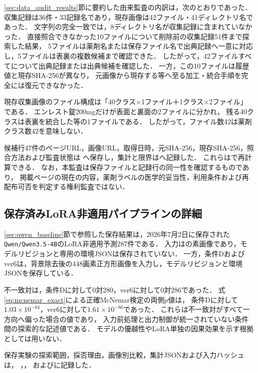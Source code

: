 \documentclass[uplatex,dvipdfmx]{jsarticle}
\begin{document}
\ref{sec:data_audit_results}節に要約した由来監査の内訳は，次のとおりであった．
収集記録は36件・33記録名であり，現存画像は42ファイル・41ディレクトリ名であった．
文字列の完全一致では，8ディレクトリ名が収集記録に含まれていなかった．
直接照合できなかった10ファイルについて削除前の収集記録51件まで探索した結果，
5ファイルは薬剤名または保存ファイル名で出典記録へ一意に対応し，5ファイルは表裏の複数候補まで確認できた．
したがって，42ファイルすべてについて出典記録または出典候補を確認した．
一方，この10ファイルは履歴値と現存SHA-256が異なり，
元画像から現存する等へ至る加工・統合手順を完全には復元できなかった．

現存収集画像のファイル構成は「40クラス$\times$1ファイル＋1クラス$\times$2ファイル」である．
エンレスト錠200mgだけが表面と裏面の2ファイルに分かれ，
残る40クラスは表裏を統合した等の1ファイルである．
したがって，ファイル数42は薬剤クラス数42を意味しない．

候補行47件のページURL，画像URL，取得日時，元SHA-256，現存SHA-256，照合方法および監査状態は
へ保存し，集計と限界はへ記録した．
これらはで再計算できる．
なお，本監査は保存ファイルと記録行の同一性を確認するものであり，
掲載ページの現在の内容，薬剤ラベルの医学的妥当性，利用条件および再配布可否を判定する権利監査ではない．

\subsection{保存済みLoRA非適用パイプラインの詳細}\label{sec:appendix_baseline}

\ref{sec:qwen_baseline}節で参照した保存結果は，2026年7月2日に保存された
\texttt{Qwen/Qwen3.5-4B}のLoRA非適用予測287件である．
入力はの素画像であり，モデルリビジョンと専用の環境JSONは保存されていない．
一方，条件Dおよびver6は，背景除去後の448画素正方形画像を入力し，モデルリビジョンと環境JSONを保存している．

不一致対は，条件Dに対して0対280，ver6に対して0対286であった．
式\eqref{eq:mcnemar_exact}による正確McNemar検定の両側$p$値は，
条件Dに対して$1.03\times10^{-84}$，ver6に対して$1.61\times10^{-86}$であった．
これらは不一致対がすべて一方向へ偏った場合の値であり，
入力前処理と出力制御が統一されていない条件間の探索的な記述値である．
モデルの優越性やLoRA単独の因果効果を示す根拠としては用いない．

保存実験の探索範囲，採否理由，画像別比較，集計JSONおよび入力ハッシュは，
，，
およびに記録した．
\end{document}
